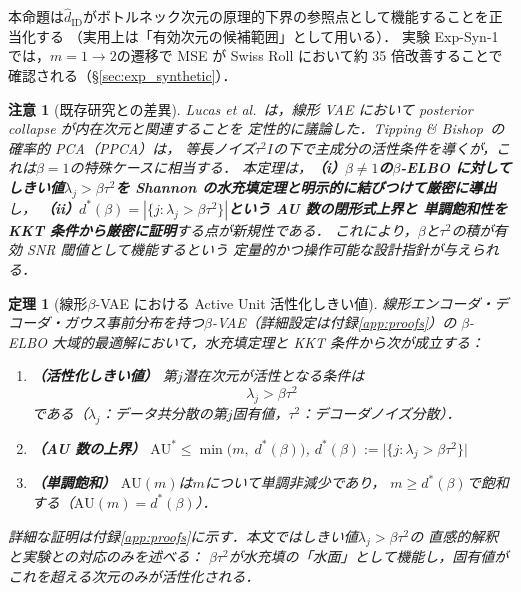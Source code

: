 \documentclass[11pt,a4paper]{jsarticle}
\newtheorem{theorem}{定理}
\newtheorem{remark}{注意}
\begin{document}
本命題は$\hat{d}_\mathrm{ID}$がボトルネック次元の原理的下界の参照点として機能することを正当化する
（実用上は「有効次元の候補範囲」として用いる）．
実験 Exp-Syn-1 では，$m = 1 \to 2$の遷移で MSE が Swiss Roll において約 35 倍改善することで確認される（§\ref{sec:exp_synthetic}）．

\begin{remark}[既存研究との差異]
Lucas et al.~\cite{lucas2019elbo}は，線形 VAE において posterior collapse が内在次元と関連することを
定性的に議論した．Tipping \& Bishop~\cite{tippingbishop1999ppca}の確率的 PCA（PPCA）は，
等長ノイズ$\tau^2 I$の下で主成分の活性条件を導くが，これは$\beta = 1$の特殊ケースに相当する．
本定理は，\textbf{（i）$\beta \neq 1$の$\beta$-ELBO に対してしきい値$\lambda_j > \beta\tau^2$を
Shannon の水充填定理\cite{cover2006elements}と明示的に結びつけて厳密に導出}し，
\textbf{（ii）$d^*(\beta) = |\{j:\lambda_j > \beta\tau^2\}|$という AU 数の閉形式上界と
単調飽和性を KKT 条件から厳密に証明}する点が新規性である．
これにより，$\beta$と$\tau^2$の積が有効 SNR 閾値として機能するという
定量的かつ操作可能な設計指針が与えられる．
\end{remark}

\begin{theorem}[線形$\beta$-VAE における Active Unit 活性化しきい値]\label{thm:linear_vae}
線形エンコーダ・デコーダ・ガウス事前分布を持つ$\beta$-VAE（詳細設定は付録\ref{app:proofs}）の
$\beta$-ELBO 大域的最適解において，水充填定理と KKT 条件から次が成立する：

\begin{enumerate}
  \item \textbf{（活性化しきい値）} 第$j$潜在次元が活性となる条件は
        \begin{equation}
          \lambda_j > \beta \tau^2 \label{eq:au_threshold}
        \end{equation}
        である（$\lambda_j$：データ共分散の第$j$固有値，$\tau^2$：デコーダノイズ分散）．
  \item \textbf{（AU 数の上界）}
        $\mathrm{AU}^* \leq \min\bigl(m,\; d^*(\beta)\bigr)$,\quad
        $d^*(\beta) := \bigl|\{j : \lambda_j > \beta\tau^2\}\bigr|$
  \item \textbf{（単調飽和）}
        $\mathrm{AU}(m)$は$m$について単調非減少であり，
        $m \geq d^*(\beta)$で飽和する（$\mathrm{AU}(m) = d^*(\beta)$）．
\end{enumerate}

\noindent
詳細な証明は付録\ref{app:proofs}に示す．本文ではしきい値$\lambda_j > \beta\tau^2$の
直感的解釈と実験との対応のみを述べる：
$\beta\tau^2$が水充填の「水面」として機能し，固有値がこれを超える次元のみが活性化される．
\end{theorem}
\end{document}
